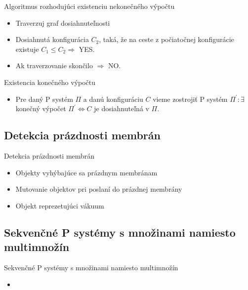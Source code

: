 \begin{frame}[t]{Algoritmus rozhodujúci existenciu nekonečného výpočtu}
  \begin{itemize}
    \item Traverzuj graf dosiahnuteľnosti
    \item Dosiahnutá konfigurácia $C_2$, taká, že na ceste z počiatočnej konfigurácie existuje $C_1\leq C_2\Rightarrow$ YES.
    \item Ak traverzovanie skončilo $\Rightarrow$ NO.
  \end{itemize}
\end{frame}

\begin{frame}[t]{Existencia konečného výpočtu}
  \begin{itemize}
    \item Pre daný P systém $\Pi$ a danú konfiguráciu $C$ vieme zostrojiť P systém $\Pi^\prime: \exists$ konečný výpočet $\Pi^\prime\Leftrightarrow C$ je dosiahnuteľná v $\Pi$.  
  \end{itemize}  
\end{frame}


\subsection{Detekcia prázdnosti membrán} %
\label{sub:detekcia_pr_zdnosti_membr_n}

\begin{frame}[t]{Detekcia prázdnosti membrán}
  \begin{itemize}
    \item Objekty vyhýbajúce sa prázdnym membránam
    \pause
    \item Mutovanie objektov pri poslaní do prázdnej membrány
    \pause
    \item Objekt reprezetujúci vákuum
  \end{itemize}  
\end{frame}


\subsection{Sekvenčné P systémy s množinami namiesto multimnožín} %
\label{sub:sekven_n_p_syst_my_s_mno_inami_namiesto_multimno_n}

\begin{frame}[t]{Sekvenčné P systémy s množinami namiesto multimnožín}
  \begin{itemize}
    \item {}
  \end{itemize}
\end{frame}

